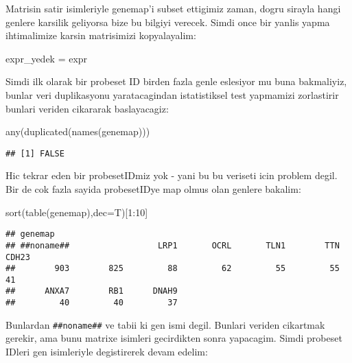 \documentclass[
]{book}
\newenvironment{Shaded}{\begin{snugshade}}{\end{snugshade}}
\newcommand{\AttributeTok}[1]{\textcolor[rgb]{0.77,0.63,0.00}{#1}}
\newcommand{\DecValTok}[1]{\textcolor[rgb]{0.00,0.00,0.81}{#1}}
\newcommand{\FunctionTok}[1]{\textcolor[rgb]{0.00,0.00,0.00}{#1}}
\newcommand{\NormalTok}[1]{#1}
\newcommand{\OtherTok}[1]{\textcolor[rgb]{0.56,0.35,0.01}{#1}}
\newcommand{\SpecialCharTok}[1]{\textcolor[rgb]{0.00,0.00,0.00}{#1}}
\begin{document}
Matrisin satir isimleriyle genemap'i subset ettigimiz zaman, dogru sirayla hangi genlere karsilik geliyorsa bize bu bilgiyi verecek. Simdi once bir yanlis yapma ihtimalimize karsin matrisimizi kopyalayalim:

\begin{Shaded}
\begin{Highlighting}[]
\NormalTok{expr\_yedek }\OtherTok{=}\NormalTok{ expr}
\end{Highlighting}
\end{Shaded}

Simdi ilk olarak bir probeset ID birden fazla genle eslesiyor mu buna bakmaliyiz, bunlar veri duplikasyonu yaratacagindan istatistiksel test yapmamizi zorlastirir bunlari veriden cikararak baslayacagiz:

\begin{Shaded}
\begin{Highlighting}[]
\FunctionTok{any}\NormalTok{(}\FunctionTok{duplicated}\NormalTok{(}\FunctionTok{names}\NormalTok{(genemap)))}
\end{Highlighting}
\end{Shaded}

\begin{verbatim}
## [1] FALSE
\end{verbatim}

Hic tekrar eden bir probesetIDmiz yok - yani bu bu veriseti icin problem degil. Bir de cok fazla sayida probesetIDye map olmus olan genlere bakalim:

\begin{Shaded}
\begin{Highlighting}[]
\FunctionTok{sort}\NormalTok{(}\FunctionTok{table}\NormalTok{(genemap),}\AttributeTok{dec=}\NormalTok{T)[}\DecValTok{1}\SpecialCharTok{:}\DecValTok{10}\NormalTok{]}
\end{Highlighting}
\end{Shaded}

\begin{verbatim}
## genemap
## ##noname##                  LRP1       OCRL       TLN1        TTN      CDH23 
##        903        825         88         62         55         55         41 
##      ANXA7        RB1      DNAH9 
##         40         40         37
\end{verbatim}

Bunlardan \texttt{\textquotesingle{}\#\#noname\#\#} ve \texttt{\textquotesingle{}\textquotesingle{}} tabii ki gen ismi degil. Bunlari veriden cikartmak gerekir, ama bunu matrixe isimleri gecirdikten sonra yapacagim. Simdi probeset IDleri gen isimleriyle degistirerek devam edelim:
\end{document}
